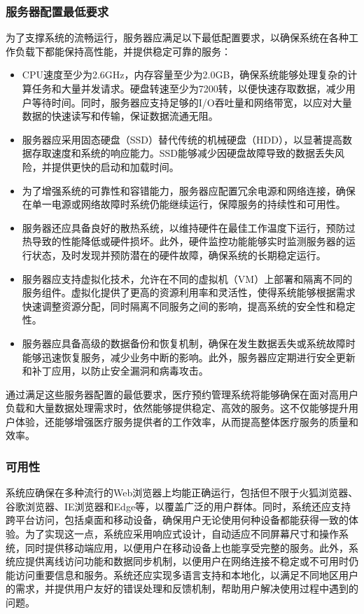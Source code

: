 \subsubsection{服务器配置最低要求}
为了支撑系统的流畅运行，服务器应满足以下最低配置要求，以确保系统在各种工作负载下都能保持高性能，并提供稳定可靠的服务：
\begin{itemize}
	\item CPU速度至少为2.6GHz，内存容量至少为2.0GB，确保系统能够处理复杂的计算任务和大量并发请求。硬盘转速至少为7200转，以便快速存取数据，减少用户等待时间。同时，服务器应支持足够的I/O吞吐量和网络带宽，以应对大量数据的快速读写和传输，保证数据流通无阻。
	\item 服务器应采用固态硬盘（SSD）替代传统的机械硬盘（HDD），以显著提高数据存取速度和系统的响应能力。SSD能够减少因硬盘故障导致的数据丢失风险，并提供更快的启动和加载时间。
	\item 为了增强系统的可靠性和容错能力，服务器应配置冗余电源和网络连接，确保在单一电源或网络故障时系统仍能继续运行，保障服务的持续性和可用性。
	\item 服务器还应具备良好的散热系统，以维持硬件在最佳工作温度下运行，预防过热导致的性能降低或硬件损坏。此外，硬件监控功能能够实时监测服务器的运行状态，及时发现并预防潜在的硬件故障，确保系统的长期稳定运行。
	\item 服务器应支持虚拟化技术，允许在不同的虚拟机（VM）上部署和隔离不同的服务组件。虚拟化提供了更高的资源利用率和灵活性，使得系统能够根据需求快速调整资源分配，同时隔离不同服务之间的影响，提高系统的安全性和稳定性。
	\item 服务器应具备高级的数据备份和恢复机制，确保在发生数据丢失或系统故障时能够迅速恢复服务，减少业务中断的影响。此外，服务器应定期进行安全更新和补丁应用，以防止安全漏洞和病毒攻击。
\end{itemize}

通过满足这些服务器配置的最低要求，医疗预约管理系统将能够确保在面对高用户负载和大量数据处理需求时，依然能够提供稳定、高效的服务。这不仅能够提升用户体验，还能够增强医疗服务提供者的工作效率，从而提高整体医疗服务的质量和效率。

\subsubsection{可用性}
系统应确保在多种流行的Web浏览器上均能正确运行，包括但不限于火狐浏览器、谷歌浏览器、IE浏览器和Edge等，以覆盖广泛的用户群体。同时，系统还应支持跨平台访问，包括桌面和移动设备，确保用户无论使用何种设备都能获得一致的体验。为了实现这一点，系统应采用响应式设计，自动适应不同屏幕尺寸和操作系统，同时提供移动端应用，以便用户在移动设备上也能享受完整的服务。此外，系统应提供离线访问功能和数据同步机制，以便用户在网络连接不稳定或不可用时仍能访问重要信息和服务。系统还应实现多语言支持和本地化，以满足不同地区用户的需求，并提供用户友好的错误处理和反馈机制，帮助用户解决使用过程中遇到的问题。

